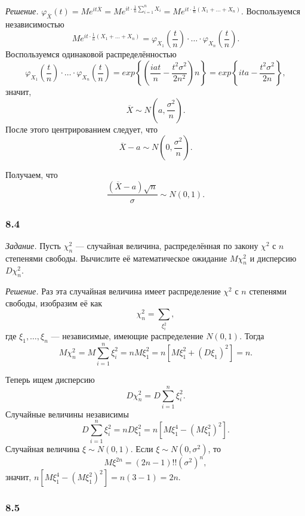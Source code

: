 \textit{Решение.}
$ \varphi_{ \overline{X}} \left( t \right) =
  Me^{it \overline{X}} =
  Me^{it \cdot \frac{1}{n} \sum \limits_{i = 1}^n X_i} =
  Me^{it \cdot \frac{1}{n} \left( X_1 + \dotsc + X_n \right) }$.
Воспользуемся независимостью
$$Me^{it \cdot \frac{1}{n} \left( X_1 + \dotsc + X_n \right) } =
  \varphi_{X_1} \left( \frac{t}{n} \right) \cdot \dotsc \cdot
  \varphi_{X_n} \left( \frac{t}{n} \right).$$
Воспользуемся одинаковой распределённостью
$$ \varphi_{X_1} \left( \frac{t}{n} \right) \cdot \dotsc \cdot
  \varphi_{X_n} \left( \frac{t}{n} \right) =
  exp \left\{ \left( \frac{iat}{n} - \frac{t^2 \sigma^2}{2n^2} \right) n \right\} =
  exp \left\{ ita - \frac{t^2 \sigma^2}{2n} \right\},$$
значит,
$$ \overline{X} \sim
  N \left( a, \frac{ \sigma^2}{n} \right).$$
После этого центрированием следует, что
$$ \overline{X} - a \sim
  N \left( 0, \frac{ \sigma^2}{n} \right).$$

Получаем, что
$$ \frac{ \left( \overline{X} - a \right) \sqrt{n}}{ \sigma } \sim
  N \left( 0, 1 \right).$$

\subsubsection*{8.4}

\textit{Задание.}
Пусть $ \chi_n^2$ --- случайная величина,
распределённая по закону $ \chi^2$ с $n$ степенями свободы.
Вычислите её математическое ожидание $M \chi_n^2$ и дисперсию $D \chi_n^2$.

\textit{Решение.}
Раз эта случайная величина имеет распределение $ \chi^2$ с $n$ степенями свободы, изобразим её как
$$ \chi_n^2 =
  \sum \limits_{ \xi_i^2},$$
где $ \xi_1, \dotsc, \xi_n$ --- независимые, имеющие распределение $N \left( 0, 1 \right) $.
Тогда
$$M \chi_n^2 =
  M \sum \limits_{i = 1}^n \xi_i^2 =
  nM \xi_1^2 =
  n \left[ M \xi_1^2 + \left( D \xi_1 \right)^2 \right] =
  n.$$

Теперь ищем дисперсию
$$D \chi_n^2 =
  D \sum \limits_{i = 1}^n \xi_i^2.$$
Случайные величины независимы
$$D \sum \limits_{i = 1}^n \xi_i^2 =
  nD \xi_1^2 =
  n \left[ M \xi_1^4 - \left( M \xi_1^2 \right)^2 \right].$$
Случайная величина $ \xi \sim N \left( 0, 1 \right) $.
Если $ \xi \sim N \left( 0, \sigma^2 \right) $,
то
$$M \xi^{2n} =
  \left( 2n - 1 \right)!! \left( \sigma^2 \right)^n,$$
значит,
$n \left[ M \xi_1^4 - \left( M \xi_1^2 \right)^2 \right] =
  n \left( 3 - 1 \right) =
  2n$.

\subsubsection*{8.5}

